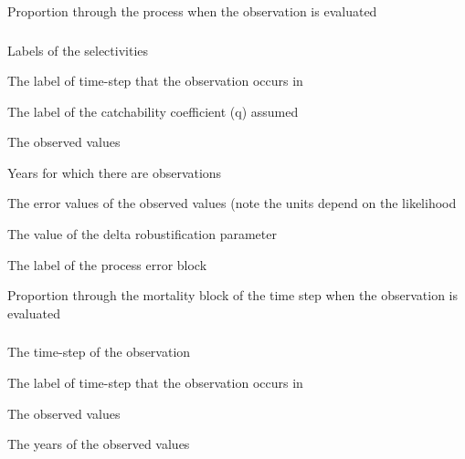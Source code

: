  {Proportion through the process when the observation is evaluated}

\subsubsection[Abundance]{}

 {Labels of the selectivities}

 {The label of time-step that the observation occurs in}

 {The label of the catchability coefficient (q) assumed}

 {The observed values}

 {Years for which there are observations}

 {The error values of the observed values (note the units depend on the likelihood}

 {The value of the delta robustification parameter}

 {The label of the process error block}

 {Proportion through the mortality block of the time step when the observation is evaluated}

\subsubsection[Process Biomass]{}

 {The time-step of the observation}

 {The label of time-step that the observation occurs in}

 {The observed values}

 {The years of the observed values}

